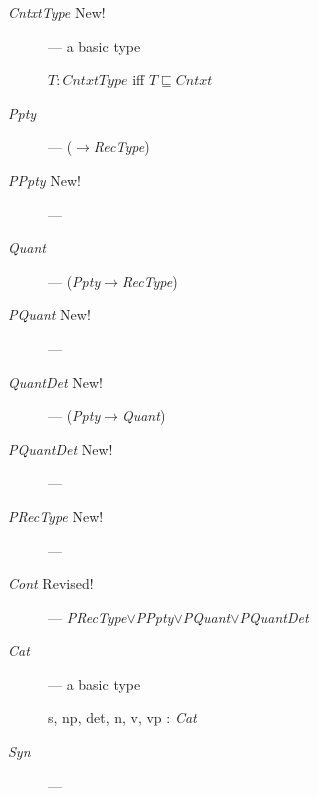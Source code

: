 \begin{description}
    
  \item[\textnormal{\textit{CntxtType}} New!] --- a basic type

    $T:\textit{CntxtType}$ iff $T\sqsubseteq\textit{Cntxt}$
    
      \item[\textnormal{\textit{Ppty}}] ---
        ($\rightarrow$\textit{RecType})
        
      \item[\textnormal{\textit{PPpty}} New!] --- 
        
      \item[\textnormal{\textit{Quant}}] ---
        (\textit{Ppty}$\rightarrow$\textit{RecType})
        
      \item[\textnormal{\textit{PQuant}} New!] --- 
        
      \item[\textnormal{\textit{QuantDet}} New!] ---
        (\textit{Ppty}$\rightarrow$\textit{Quant})
        
      \item[\textnormal{\textit{PQuantDet}} New!] ---
        
      \item[\textnormal{\textit{PRecType}} New!] ---
          

    \item[\textnormal{\textit{Cont}} Revised!] --- \textit{PRecType}$\vee$\textit{PPpty}$\vee$\textit{PQuant}$\vee$\textit{PQuantDet}

      
    \item[\textnormal{\textit{Cat}}] --- a basic type

      s, np, det, n, v, vp : \textit{Cat}

    
    \item[\textnormal{\textit{Syn}}] ---   
 



\end{description}
